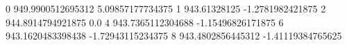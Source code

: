 0 949.9900512695312 5.09857177734375
1 943.61328125 -1.2781982421875
2 944.8914794921875 0.0
4 943.7365112304688 -1.15496826171875
6 943.1620483398438 -1.72943115234375
8 943.4802856445312 -1.41119384765625
